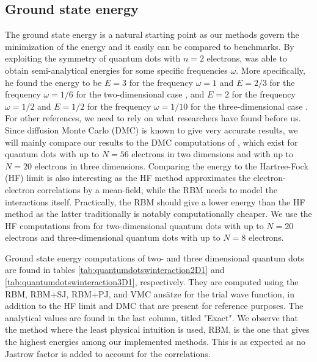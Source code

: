 \subsection{Ground state energy} \label{sec:groundstateenergy}
The ground state energy is a natural starting point as our methods govern the minimization of the energy and it easily can be compared to benchmarks. By exploiting the symmetry of quantum dots with $n=2$ electrons, \citeauthor{taut_two_1993} was able to obtain semi-analytical energies for some specific frequencies $\omega$. More specifically, he found the energy to be $E=3$ for the frequency $\omega=1$ and $E=2/3$ for the frequency $\omega=1/6$ for the two-dimensional case \supercite{taut_two_1993}, and $E=2$ for the frequency $\omega=1/2$ and $E=1/2$ for the frequency $\omega=1/10$ for the three-dimensional case \supercite{taut_two_1994}. For other references, we need to rely on what researchers have found before us. Since diffusion Monte Carlo (DMC) is known to give very accurate results, we will mainly compare our results to the DMC computations of \citet{hogberget_quantum_2013}, which exist for quantum dots with up to $N=56$ electrons in two dimensions and with up to $N=20$ electrons in three dimensions. Comparing the energy to the Hartree-Fock (HF) limit is also interesting as the HF method approximates the electron-electron correlations by a mean-field, while the RBM needs to model the interactions itself. Practically, the RBM should give a lower energy than the HF method as the latter traditionally is notably computationally cheaper. We use the HF computations from \citet{mariadason_quantum_2018} for two-dimensional quantum dots with up to $N=20$ electrons and three-dimensional quantum dots with up to $N=8$ electrons.

Ground state energy computations of two- and three dimensional quantum dots are found in tables \eqref{tab:quantumdotswinteraction2D1} and \eqref{tab:quantumdotswinteraction3D1}, respectively. They are computed using the RBM, RBM+SJ, RBM+PJ, and VMC ansätze for the trial wave function, in addition to the HF limit and DMC that are present for reference purposes. The analytical values are found in the last column, titled "Exact". We observe that the method where the least physical intuition is used, RBM, is the one that gives the highest energies among our implemented methods. This is as expected as no Jastrow factor is added to account for the correlations. 

